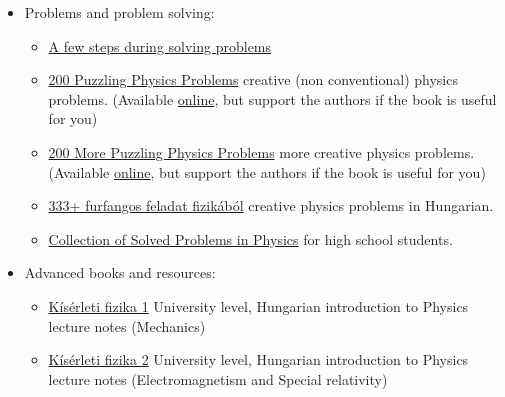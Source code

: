 \documentclass{article}
\begin{document}
\begin{itemize}
\begin{itemize}
\end{itemize}

\item Problems and problem solving:
\begin{itemize}
    
    \item \href{https://isaacphysics.org/solving_problems}{A few steps during solving problems}
    
    \item \href{https://www.cambridge.org/core/books/200-puzzling-physics-problems/BBD12C169F5FAFDA285F155D62A04D12}{200 Puzzling Physics Problems} creative (non conventional) physics problems. (Available \href{https://shrek.unideb.hu/~learner/elemifizika/200%20puzzling%20physics%20problem.pdf}{online}, but support the authors if the book is useful for you)
    
    \item \href{https://www.cambridge.org/hu/academic/subjects/physics/general-and-classical-physics/200-more-puzzling-physics-problems-hints-and-solutions?format=HB&isbn=9781107103856}{200 More Puzzling Physics Problems} more creative physics problems. (Available \href{https://archive.org/details/200-more-puzzling-physics-problems-with-hints-and-solutions-gnv-64/}{online}, but support the authors if the book is useful for you)
    
    \item \href{https://www.typotex.hu/book/8924/gnadig_honyek_vigh_333___furfangos_feladat_fizikabol}{333+ furfangos feladat fizikából} creative physics problems in Hungarian.
    
    \item \href{http://physicstasks.eu/en}{Collection of Solved Problems in Physics} for high school students.
    
\end{itemize}

\item Advanced books and resources:
\begin{itemize}
    \item \href{https://mek.oszk.hu/14100/14198/14198.pdf}{Kísérleti fizika 1} University level, Hungarian introduction to Physics lecture notes (Mechanics)
    
    \item \href{http://physics.bme.hu/sites/physics.bme.hu/files/users/BMETE12AF46_kov/kisfiz2_jav.pdf}{Kísérleti fizika 2} University level, Hungarian introduction to Physics lecture notes (Electromagnetism and Special relativity)
    

\end{itemize}
\end{itemize}
\end{document}
